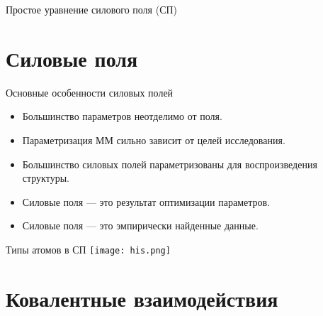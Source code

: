\begin{frame}{Простое уравнение силового поля (СП)}
\begin{center}
\end{center}


\end{frame}




\section{Силовые поля}
\begin{frame}{Основные особенности силовых полей}{}
\begin{itemize}
\vspace{0.2cm}
  \item
Большинство параметров неотделимо от поля.
\vspace{0.2cm}
  \item
Параметризация ММ сильно зависит от целей исследования.
\vspace{0.2cm}
  \item
Большинство  силовых  полей параметризованы для воспроизведения структуры.
\vspace{0.2cm}
  \item
Силовые поля — это результат оптимизации параметров.
\vspace{0.2cm}
  \item
Силовые поля — это эмпирически найденные данные.
\end{itemize}
\end{frame}


\begin{frame}{Типы атомов в СП}{}
\texttt{[image: his.png]}
\end{frame}

\section{Ковалентные взаимодействия}

